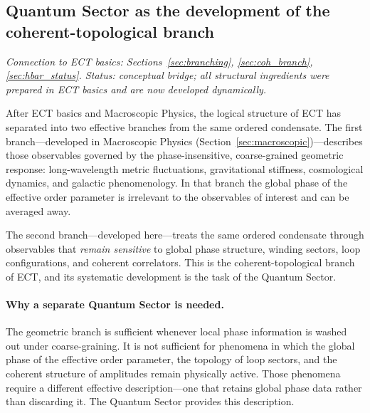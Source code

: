 \subsection{Quantum Sector as the development of the
coherent-topological branch}
\label{sec:qs_intro}

\textit{Connection to ECT basics:
Sections~\ref{sec:branching}, \ref{sec:coh_branch},
\ref{sec:hbar_status}.
Status: conceptual bridge; all structural ingredients were
prepared in ECT basics and are now developed dynamically.}

\medskip
After ECT basics and Macroscopic Physics, the logical structure
of ECT has separated into two effective branches from the same
ordered condensate.
The first branch---developed in Macroscopic Physics
(Section~\ref{sec:macroscopic})---describes those observables
governed by the phase-insensitive, coarse-grained geometric
response: long-wavelength metric fluctuations, gravitational
stiffness, cosmological dynamics, and galactic phenomenology.
In that branch the global phase of the effective order parameter
is irrelevant to the observables of interest and can be averaged away.

The second branch---developed here---treats the same ordered
condensate through observables that \emph{remain sensitive} to
global phase structure, winding sectors, loop configurations,
and coherent correlators.
This is the coherent-topological branch of ECT, and its systematic
development is the task of the Quantum Sector.

\paragraph{Why a separate Quantum Sector is needed.}
The geometric branch is sufficient whenever local phase information
is washed out under coarse-graining.
It is not sufficient for phenomena in which the global phase of
the effective order parameter, the topology of loop sectors, and the
coherent structure of amplitudes remain physically active.
Those phenomena require a different effective description---one that
retains global phase data rather than discarding it.
The Quantum Sector provides this description.

